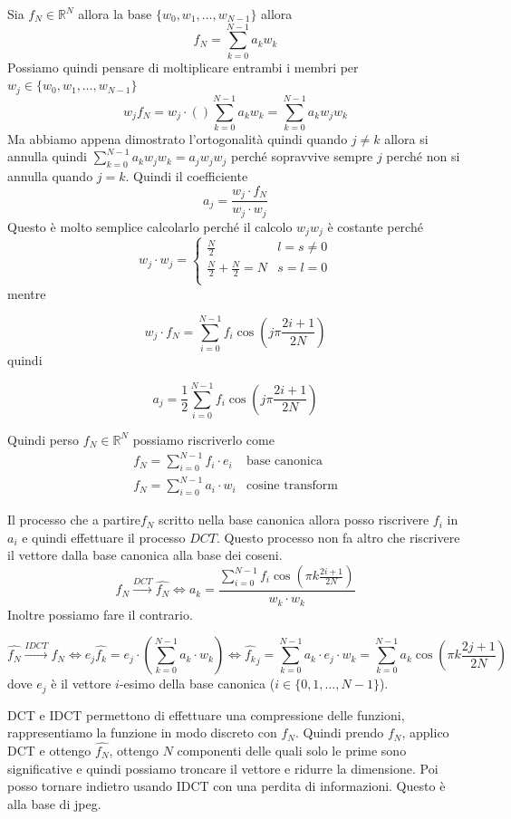 Sia $f_N\in \mathbb{R}^N$ allora la base $\{w_0,w_1,\dots,w_{N-1}\}$ allora 
$$f_N = \sum_{k=0}^{N-1} a_k w_k$$
Possiamo quindi pensare di moltiplicare entrambi i membri per $w_j\in \{w_0,w_1,\dots,w_{N-1}\}$
$$w_j f_N = w_j  \cdot \left(\right)\sum_{k=0}^{N-1} a_k w_k = \sum_{k=0}^{N-1} a_k w_j w_k $$
Ma abbiamo appena dimostrato l'ortogonalità quindi quando $j\ne k$ allora si annulla 
quindi $\sum_{k=0}^{N-1} a_k w_j w_k = a_j w_j w_j$ perché sopravvive 
sempre $j$ perché non si annulla quando $j=k$. Quindi il coefficiente 
$$a_j = \frac{w_j \cdot f_N}{w_j \cdot w_j}$$
Questo è molto semplice calcolarlo perché il calcolo $w_j w_j$ è costante perché
$$w_j \cdot w_j = 
\begin{cases}
    \frac{N}{2} & l = s  \ne 0\\ 
    \frac{N}{2} + \frac{N}{2} = N & s=l =0\\
\end{cases}$$
mentre 

$$w_j \cdot f_N = \sum_{i=0}^{N-1} f_i \cos\left(j\pi \frac{2i+1}{2N}\right)$$
quindi 

$$a_j =\frac{1}{2}\sum_{i=0}^{N-1} f_i \cos\left(j\pi \frac{2i+1}{2N}\right) $$

Quindi perso $f_N\in \mathbb{R}^N$ possiamo riscriverlo come 
$$\begin{array}{cl}
    f_N = \sum_{i=0}^{N-1} f_i \cdot e_i & \text{base canonica}\\
    f_N = \sum_{i=0}^{N-1} a_i \cdot w_i & \text{cosine transform}
\end{array}$$ 

Il processo che a partire$f_N$ scritto nella base canonica allora posso riscrivere 
$f_i$ in $a_i$ e quindi effettuare il processo $DCT$. Questo processo non fa altro 
che riscrivere il vettore dalla base canonica alla base dei coseni.
$$f_N \stackrel{DCT}{\to } \hat{f_N} \iff a_k = \frac{\sum_{i = 0}^{N-1}f_i\cos \left(\pi k \frac{2i +1}{2N}\right)}{w_k\cdot w_k}$$
Inoltre possiamo fare il contrario.

$$ \hat{f_N}  \stackrel{IDCT}{\to }f_N \iff e_j \hat{f_k} = e_j \cdot \left(\sum_{k=0}^{N-1}a_k \cdot w_k\right)  \iff \hat{f_k}_j = \sum_{k=0}^{N-1}  a_k \cdot e_j \cdot w_k   =  \sum_{k=0}^{N-1}  a_k  \cos\left(\pi k \frac{2j+1}{2N}\right)$$
dove $e_j$ è il vettore $i$-esimo della base canonica ($i\in \{0,1,\dots, N-1\}$).

DCT e IDCT permettono di effettuare una compressione delle funzioni, rappresentiamo 
la funzione in modo discreto con $f_N$. Quindi prendo $f_N$, applico DCT e ottengo $\hat{f_N}$, ottengo $N$ componenti 
delle quali solo le prime sono significative e quindi possiamo troncare il vettore 
e ridurre la dimensione. Poi posso tornare indietro usando IDCT con una perdita di 
informazioni. Questo è alla base di jpeg.
